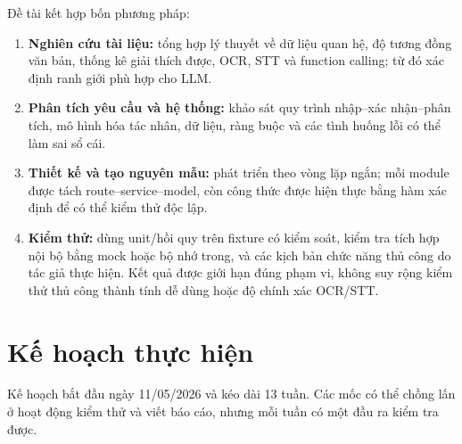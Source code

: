 Đề tài kết hợp bốn phương pháp:

\begin{enumerate}
  \item \textbf{Nghiên cứu tài liệu:} tổng hợp lý thuyết về dữ liệu quan hệ, độ tương đồng văn bản, thống kê giải thích được, OCR, STT và function calling; từ đó xác định ranh giới phù hợp cho LLM.
  \item \textbf{Phân tích yêu cầu và hệ thống:} khảo sát quy trình nhập--xác nhận--phân tích, mô hình hóa tác nhân, dữ liệu, ràng buộc và các tình huống lỗi có thể làm sai sổ cái.
  \item \textbf{Thiết kế và tạo nguyên mẫu:} phát triển theo vòng lặp ngắn; mỗi module được tách route--service--model, còn công thức được hiện thực bằng hàm xác định để có thể kiểm thử độc lập.
  \item \textbf{Kiểm thử:} dùng unit/hồi quy trên fixture có kiểm soát, kiểm tra tích hợp nội bộ bằng mock hoặc bộ nhớ trong, và các kịch bản chức năng thủ công do tác giả thực hiện. Kết quả được giới hạn đúng phạm vi, không suy rộng kiểm thử thủ công thành tính dễ dùng hoặc độ chính xác OCR/STT.
\end{enumerate}

\section{Kế hoạch thực hiện}

Kế hoạch bắt đầu ngày 11/05/2026 và kéo dài 13 tuần. Các mốc có thể chồng lấn ở hoạt động kiểm thử và viết báo cáo, nhưng mỗi tuần có một đầu ra kiểm tra được.


